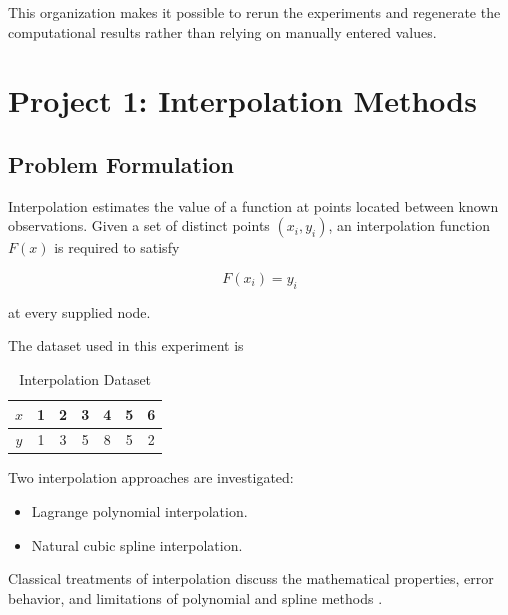 \documentclass[11pt,a4paper]{article}
\begin{document}
This organization makes it possible to rerun the experiments and regenerate
the computational results rather than relying on manually entered values.


\newpage

\section{Project 1: Interpolation Methods}

\subsection{Problem Formulation}

Interpolation estimates the value of a function at points located between
known observations. Given a set of distinct points
$(x_i,y_i)$, an interpolation function $F(x)$ is required to satisfy

\[
F(x_i)=y_i
\]

at every supplied node.

The dataset used in this experiment is

\begin{table}[H]
\centering
\caption{Interpolation Dataset}
\label{tab:interp_data}

\begin{tabular}{c|cccccc}
\toprule
$x$ & 1 & 2 & 3 & 4 & 5 & 6 \\
\midrule
$y$ & 1 & 3 & 5 & 8 & 5 & 2 \\
\bottomrule
\end{tabular}
\end{table}

Two interpolation approaches are investigated:

\begin{itemize}
    \item Lagrange polynomial interpolation.
    \item Natural cubic spline interpolation.
\end{itemize}

Classical treatments of interpolation discuss the mathematical properties,
error behavior, and limitations of polynomial and spline methods
\cite{burden2010,chapra2015}.

\end{document}

